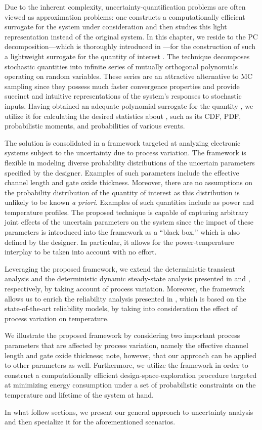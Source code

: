 Due to the inherent complexity, uncertainty-quantification problems are often
viewed as approximation problems: one constructs a computationally efficient
surrogate for the system under consideration and then studies this light
representation instead of the original system. In this chapter, we reside to the
\ac{PC} decomposition---which is thoroughly introduced in
---for the construction of such a lightweight surrogate
for the quantity of interest \g. The technique decomposes stochastic quantities
into infinite series of mutually orthogonal polynomials operating on random
variables. These series are an attractive alternative to \ac{MC} sampling since
they possess much faster convergence properties and provide succinct and
intuitive representations of the system's responses to stochastic inputs. Having
obtained an adequate polynomial surrogate for the quantity \g, we utilize it for
calculating the desired statistics about \g, such as its \ac{CDF}, \ac{PDF},
probabilistic moments, and probabilities of various events.

The solution is consolidated in a framework targeted at analyzing electronic
systems subject to the uncertainty due to process variation. The framework is
flexible in modeling diverse probability distributions of the uncertain
parameters specified by the designer. Examples of such parameters include the
effective channel length and gate oxide thickness. Moreover, there are no
assumptions on the probability distribution of the quantity of interest as this
distribution is unlikely to be known \emph{a priori}. Examples of such
quantities include as power and temperature profiles. The proposed technique is
capable of capturing arbitrary joint effects of the uncertain parameters on the
system since the impact of these parameters is introduced into the framework as
a ``black box,'' which is also defined by the designer. In particular, it allows
for the power-temperature interplay to be taken into account with no effort.

Leveraging the proposed framework, we extend the deterministic transient
analysis and the deterministic dynamic steady-state analysis presented in
 and , respectively, by
taking account of process variation. Moreover, the framework allows us to enrich
the reliability analysis presented in , which is based
on the state-of-the-art reliability models, by taking into consideration the
effect of process variation on temperature.

We illustrate the proposed framework by considering two important process
parameters that are affected by process variation, namely the effective channel
length and gate oxide thickness; note, however, that our approach can be applied
to other parameters as well. Furthermore, we utilize the framework in order to
construct a computationally efficient design-space-exploration procedure
targeted at minimizing energy consumption under a set of probabilistic
constraints on the temperature and lifetime of the system at hand.

In what follow sections, we present our general approach to uncertainty analysis
and then specialize it for the aforementioned scenarios.
